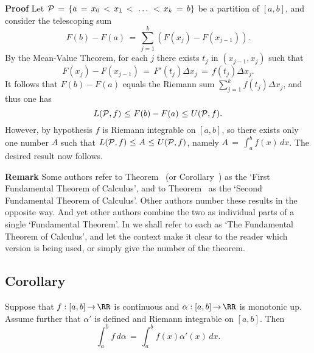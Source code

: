         {\bf Proof} Let ${\cal P} \,=\, \{a \,=\, x_{0}\,<\,x_{1}\,<\,\,{\ldots}\,\,<\,x_{k} \,=\, b\}$ be a partition of $[a,b]$,
    and consider the telescoping sum
        \begin{displaymath}
        F(b) - F(a) \,=\, \sum_{j=1}^{k} \left(F(x_{j}) - F(x_{j-1})\right).
        \end{displaymath}
    By the Mean-Value Theorem, for each $j$ there exists $t_{j}$ in $(x_{j-1},x_{j})$ such that
        \begin{displaymath}
        F(x_{j}) - F(x_{j-1}) \,=\, F'(t_{j}){\Delta}x_{j} \,=\, f(t_{j}){\Delta}x_{j}.
        \end{displaymath}
     It follows that $F(b) - F(a)$ equals the Riemann sum $\sum_{j=1}^{k} f(t_{j}){\Delta}x_{j}$, and thus one has
        \begin{displaymath}
        L({\cal P},f)\,\,{\leq}\,\,F(b) - F(a)\,\,{\leq}\,\,U({\cal P},f).
        \end{displaymath}
    However, by hypothesis $f$ is Riemann integrable on $[a,b]$, so there exists only one number $A$ such that
    $L({\cal P},f)\,\,{\leq}\,\,A\,\,{\leq}\,\,U({\cal P},f)$, namely $A \,=\, \int_{a}^{b} f(x)\,dx$. The desired result now follows.

\V
\V

        {\bf Remark} Some authors refer to Theorem~ (or Corollary~) as the `First Fundamental Theorem of Calculus',
    and to Theorem~ as the `Second Fundamental Theorem of Calculus'.
    Other authors number these results in the opposite way. And yet other authors combine the two as individual parts of a single `Fundamental Theorem'.
    In {\ThisText} we shall refer to each as `The Fundamental Theorem of Calculus',
    and let the context make it clear to the reader which version is being used, or simply give the number of the theorem.

\V

        \subsection{\small{{\bf Corollary}}}
        \label{CorH40.50}

\V

        Suppose that $f:[a,b] \,{\rightarrow}\, {\RR}$ is continuous and ${\alpha}:[a,b] \,{\rightarrow}\, {\RR}$ is monotonic up.
    Assume further that ${\alpha}'$ is defined and Riemann integrable on $[a,b]$.
    Then
        \begin{equation}
        \label{EqnH.30}
        \int_{a}^{b} f\,d{\alpha} \,=\, \int_{a}^{b} f(x){\alpha}'(x)\,dx.
        \end{equation}


